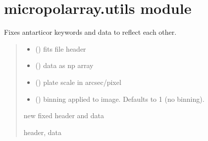 \documentclass[letterpaper,10pt,english]{sphinxmanual}
\begin{document}
\section{micropolarray.utils module}
\label{\detokenize{micropolarray:module-micropolarray.utils}}\label{\detokenize{micropolarray:micropolarray-utils-module}}

\begin{fulllineitems}
\label{\detokenize{micropolarray:micropolarray.utils.align_keywords_and_data}}
\pysigstartsignatures
{}
\pysigstopsignatures
\sphinxAtStartPar
Fixes antarticor keywords and data to reflect each other.
\begin{quote}\begin{description}
\begin{itemize}
\item {} 
\sphinxAtStartPar
{} () \textendash{} fits file header

\item {} 
\sphinxAtStartPar
{} () \textendash{} data as np array

\item {} 
\sphinxAtStartPar
{} () \textendash{} plate scale in arcsec/pixel

\item {} 
\sphinxAtStartPar
{} (\sphinxstyleliteralemphasis{\sphinxupquote{, }}) \textendash{} binning applied to image. Defaults to 1 (no binning).

\end{itemize}

\sphinxAtStartPar
new fixed header and data

\sphinxAtStartPar
header, data

\end{description}\end{quote}

\end{fulllineitems}
\end{document}
